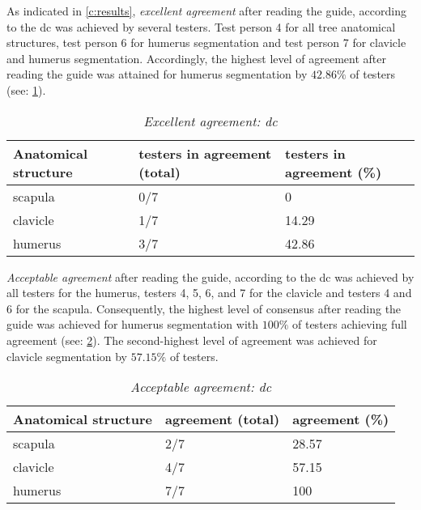 \noindent
As indicated in \cref{c:results}, \textit{excellent agreement} after reading the guide,
according to the \acrlong{dc} was achieved by several testers.
Test person 4 for all tree anatomical structures,
test person 6 for humerus segmentation
and test person 7 for clavicle and humerus segmentation.
Accordingly, the highest level of agreement after reading the guide was attained for humerus segmentation 
by $42.86\%$ of testers (see: \cref{tab:dc-excellent}).
\begin{table}[ht]
	\begin{center}
		\begin{tabular}{l l l}
			\textbf{Anatomical structure} & testers in agreement (total) & testers in  agreement (\%) \\
			\hline
			scapula                       & 0/7                          & 0                          \\
			clavicle                      & 1/7                          & 14.29                      \\
			humerus                       & 3/7                          & 42.86                      \\
		\end{tabular}
		\caption{\textit{Excellent agreement: \acrshort{dc}}}\label{tab:dc-excellent}
	\end{center}
\end{table}

\noindent
\textit{Acceptable agreement} after reading the guide, according to the \acrshort{dc} was achieved by all testers for the humerus,
testers 4, 5, 6, and 7 for the clavicle
and testers 4 and 6 for the scapula.
Consequently, the highest level of consensus after reading the guide was achieved for humerus segmentation with $100\%$ 
of testers achieving full agreement (see: \cref{tab:dc-acceptable}).
The second-highest level of agreement was achieved for clavicle segmentation by $57.15\%$ of testers.
\begin{table}[ht]
	\begin{center}
		\begin{tabular}{l l l}
			\textbf{Anatomical structure} & agreement (total) & agreement (\%) \\
			\hline
			scapula                       & 2/7               & 28.57          \\
			clavicle                      & 4/7               & 57.15          \\
			humerus                       & 7/7               & 100            \\
		\end{tabular}
		\caption{\textit{Acceptable agreement: \acrshort{dc}}}\label{tab:dc-acceptable}
	\end{center}
\end{table}


